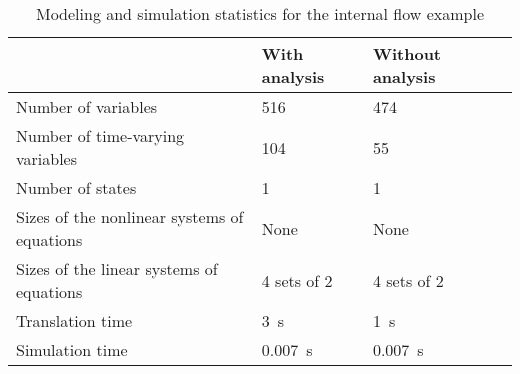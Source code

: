 \begin{table}[h]
  \caption{Modeling and simulation statistics for the internal flow example}
  \begin{singlespaced}%
    \begin{tabular}{llll}%
      \toprule 
      & With analysis & Without analysis \\
        \midrule
      Number of variables & 516 & 474 \\
      Number of time-varying variables & 104 & 55 \\
      Number of states & 1 & 1 \\
      Sizes of the nonlinear systems of equations & None & None \\
      Sizes of the linear systems of equations & 4 sets of 2 & 4 sets of 2 \\
      Translation time & \SI{3}{s} & \SI{1}{s} \\
      Simulation time & \SI{0.007}{s} & \SI{0.007}{s} \\
      \bottomrule
    \end{tabular}
  \end{singlespaced}
\end{table}

